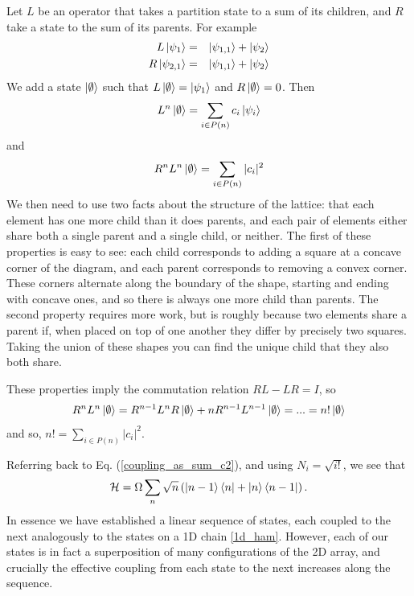 Let $L$ be an operator that takes a partition state to a sum of its
children, and $R$ take a state to the sum of its parents. For example\begin{eqnarray*}
  L\left\vert\psi_{1}\right\rangle & = & \left\vert\psi_{1,1}\right\rangle+\left\vert\psi_{2}\right\rangle\\
  R\left\vert\psi_{2,1}\right\rangle & = & \left\vert\psi_{1,1}\right\rangle+\left\vert\psi_{2}\right\rangle\end{eqnarray*}
We add a state $\left\vert\emptyset\right\rangle$ such that $L\left\vert\emptyset\right\rangle=\left\vert\psi_{1}\right\rangle$
and $R\left\vert\emptyset\right\rangle=0$. Then
\begin{align}
  L^{n}\left\vert\emptyset\right\rangle=\sum_{i\in P(n)}c_{i}\left\vert\psi_{i}\right\rangle
\end{align}
and
\begin{align}
  R^{n}L^{n}\left\vert\emptyset\right\rangle=\sum_{i\in P(n)}|c_{i}|^{2}
\end{align}
We then need to use two facts about the structure of the lattice: that each element has one more child than it does parents, and each pair of elements either share both a single parent and a single child, or neither. The first of these properties is easy to see: each child corresponds to adding a square at a concave corner of the diagram, and each parent corresponds to removing a convex corner. These corners alternate along the boundary of the shape, starting and ending with concave ones, and so there is always one more child than parents.  The second property requires more work, but is roughly because two elements share a parent if, when placed on top of one another they differ by precisely two squares. Taking the union of these shapes you can find the unique child that they also both share.

These properties imply the commutation relation $RL-LR=I$, so
\begin{align}
  R^{n}L^{n}\left\vert\emptyset\right\rangle=R^{n-1}L^{n}R\left\vert\emptyset\right\rangle+nR^{n-1}L^{n-1}\left\vert\emptyset\right\rangle=...=n!\left\vert\emptyset\right\rangle
\end{align}
and so, $n!=\sum_{i\in P(n)}|c_{i}|^{2}$.

Referring back to Eq. (\ref{coupling_as_sum_c2}), and using $N_i=\sqrt{i!}$, we see that
\begin{equation}
  {\cal{H}} = \Omega \sum_{n} \sqrt{n} \left( \left\vert n-1\right\rangle \left\langle n\right\vert +
  \left\vert n\right\rangle \left\langle n-1\right\vert \right) .
  \label{2d_ham}
\end{equation}
In essence we have established a linear sequence of states, each coupled to the next analogously to the states on a 1D chain \ref{1d_ham}. However, each of our states is in fact a superposition of many configurations of the 2D array, and crucially the effective coupling from each state to the next increases along the sequence.

